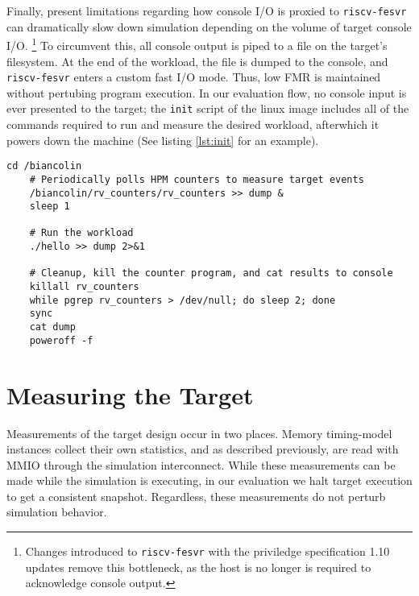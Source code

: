Finally, present limitations regarding how console I/O is proxied to
\texttt{riscv-fesvr} can dramatically slow down simulation depending on the
volume of target console I/O. \footnote{Changes introduced to
\texttt{riscv-fesvr} with the priviledge specification 1.10 updates remove this
bottleneck, as the host is no longer is required to acknowledge console
output.} To circumvent this, all console output is piped to a file on the
target's filesystem. At the end of the workload, the file is dumped to the
console, and \texttt{riscv-fesvr} enters a custom fast I/O mode.  Thus, low FMR
is maintained without pertubing program execution. In our evaluation flow, no
console input is ever presented to the target; the \texttt{init} script of the
linux image includes all of the commands required to run and measure the
desired workload, afterwhich it powers down the machine (See listing
\ref{lst:init} for an example).\\


\lstset{style=init}

\begin{lstlisting}[caption={An example init script generated during the build process},label={lst:init}]
    cd /biancolin
    # Periodically polls HPM counters to measure target events
    /biancolin/rv_counters/rv_counters >> dump &
    sleep 1

    # Run the workload
    ./hello >> dump 2>&1

    # Cleanup, kill the counter program, and cat results to console
    killall rv_counters
    while pgrep rv_counters > /dev/null; do sleep 2; done
    sync
    cat dump
    poweroff -f
\end{lstlisting}

\section{Measuring the Target}

Measurements of the target design occur in two places.
Memory timing-model instances collect their own statistics, and
as described previously, are read with MMIO through the simulation
interconnect. While these measurements can be made while the simulation is
executing, in our evaluation we halt target execution to get a consistent
snapshot. Regardless, these measurements do not perturb simulation behavior.

